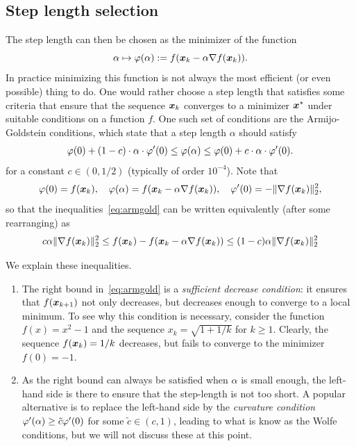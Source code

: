 \subsection{Step length selection}
The step length can then be chosen as the minimizer of the function
\begin{equation*}
 \alpha \mapsto \varphi(\alpha) := f(\bm{x}_k-\alpha \nabla f(\bm{x}_k)).
\end{equation*}
In practice minimizing this function is not always the most efficient (or even possible) thing to do. One would rather choose a step length that satisfies some criteria that ensure that the sequence $\bm{x}_k$ converges to a minimizer $\bm{x}^*$ under suitable conditions on a function $f$. One such set of conditions are the Armijo-Goldstein conditions, which state that a step length $\alpha$ should satisfy 
\begin{equation}\label{eq:armgold}
 \varphi(0)+(1-c)\cdot \alpha \cdot \varphi'(0)\leq \varphi(\alpha) \leq \varphi(0)+c\cdot \alpha \cdot \varphi'(0).
\end{equation}
for a constant $c\in (0,1/2)$ (typically of order $10^{-4}$). Note that
\begin{equation*}
 \varphi(0) = f(\bm{x}_k), \quad \varphi(\alpha) = f(\bm{x}_k-\alpha\nabla f(\bm{x}_k)), \quad \varphi'(0) = -\Vert {\nabla f(\bm{x}_k)}\Vert_2^2,
\end{equation*}
so that the inequalities~\eqref{eq:armgold} can be written equivalently (after some rearranging) as
\begin{equation*}
 c\alpha \Vert {\nabla f(\bm{x}_k)}\Vert_2^2 \leq f(\bm{x}_k)-f(\bm{x}_k-\alpha \nabla f(\bm{x}_k)) \leq (1-c)\alpha \Vert {\nabla f(\bm{x}_k)}\Vert_2^2
\end{equation*}

We explain these inequalities.

\begin{enumerate}
\item The right bound in~\eqref{eq:armgold} is a {\em sufficient decrease condition}: it ensures that $f(\bm{x}_{k+1})$ not only decreases, but decreases enough to converge to a local minimum. To see why this condition is necessary, consider the function $f(x)=x^2-1$ and the sequence $x_k = \sqrt{1+1/k}$ for $k\geq 1$. Clearly, the sequence $f(\bm{x}_k)=1/k$ decreases, but fails to converge to the minimizer $f(0)=-1$.
\item As the right bound can always be satisfied when $\alpha$ is small enough, the left-hand side is there to ensure that the step-length is not too short. A popular alternative is to replace the left-hand side by the {\em curvature condition} $\varphi'(\alpha)\geq \tilde{c} \varphi'(0)$ for some $\tilde{c}\in (c,1)$, leading to what is know as the Wolfe conditions, but we will not discuss these at this point.
\end{enumerate}

